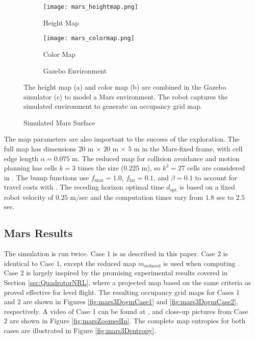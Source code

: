 

\begin{figure}[!t]
	\centering
	\begin{subfigure}[t]{0.3\columnwidth}
           	\centering
          	\texttt{[image: mars\_heightmap.png]}
        		\caption{Height Map}
    	\end{subfigure}
    	\begin{subfigure}[t]{0.3\columnwidth}
           	\centering
          	\texttt{[image: mars\_colormap.png]}
        		\caption{Color Map}
    	\end{subfigure}
    	\begin{subfigure}[t]{0.3\columnwidth}
        		\caption{Gazebo Environment}
    	\end{subfigure}
	\caption{Simulated Mars Surface}
	\medskip
	\small
	The height map (a) and color map (b) are combined in the Gazebo simulator (c) to model a Mars environment. The robot captures the simulated environment to generate an occupancy grid map.
	\label{fig:MarsGazebo}
\end{figure}

The map parameters are also important to the success of the exploration. The full map has dimensions $20$ m $\times$ $20$ m $\times$ $5$ m in the Mars-fixed frame, with cell edge length $\alpha=0.075$ m. The reduced map for collision avoidance and motion planning has cells $k=3$ times the size ($0.225$ m), so $k^3=27$ cells are considered in . The bump functions use $f_\text{max}=1.0$, $f_\text{far}=0.1$, and $\beta=0.1$ to account for travel costs with . The receding horizon optimal time $d_\text{opt}$ is based on a fixed robot velocity of $0.25$ m/sec and the computation times vary from $1.8$ sec to $2.5$ sec.

\subsection{Mars Results}

The simulation is run twice. Case 1 is as described in this paper. Case 2 is identical to Case 1, except the reduced map $ m_\text{reduced}$ is used when computing . Case 2 is largely inspired by the promising experimental results covered in Section \ref{sec:QuadrotorNRL}, where a projected map based on the same criteria as  proved effective for level flight. The resulting occupancy grid maps for Cases 1 and 2 are shown in Figures \ref{fig:mars3DogmCase1} and \ref{fig:mars3DogmCase2}, respectively. A video of Case 1 can be found at \href{https://youtu.be/FrBcL2UMW9w}{}, and close-up pictures from Case 2 are shown in Figure \ref{fig:marsZoomedIn}. The complete map entropies for both cases are illustrated in Figure \ref{fig:mars3Dentropy}.


